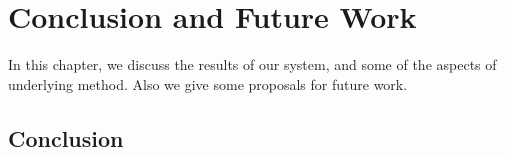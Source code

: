 
\chapter{Conclusion and Future Work}
\label{chap:conclusions}

In this chapter, we discuss the results of our system, and some of the aspects of underlying method. Also we give some proposals for future work.




\section{Conclusion}



